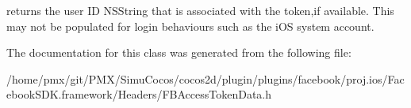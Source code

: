 returns the user ID N\+S\+String that is associated with the token,if available.  This may not be populated for login behaviours such as the i\+OS system account. 

The documentation for this class was generated from the following file\+:\begin{DoxyCompactItemize}
\item 
/home/pmx/git/\+P\+M\+X/\+Simu\+Cocos/cocos2d/plugin/plugins/facebook/proj.\+ios/\+Facebook\+S\+D\+K.\+framework/\+Headers/F\+B\+Access\+Token\+Data.\+h\end{DoxyCompactItemize}
